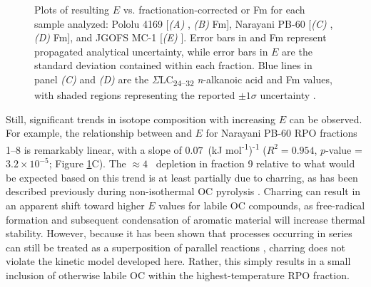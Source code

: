 \begin{figure}[p]
	\caption[RPO $E$ vs. isotope plots for all fractions in all samples]{Plots of resulting $E$ vs. fractionation-corrected  or Fm for each sample analyzed: Pololu 4169 [\textit{(A)} , \textit{(B)} Fm], Narayani PB-60 [\textit{(C)} , \textit{(D)} Fm], and JGOFS MC-1 [\textit{(E)} ]. Error bars in  and Fm represent propagated analytical uncertainty, while error bars in $E$ are the standard deviation contained within each fraction. Blue lines in panel \textit{(C)} and \textit{(D)} are the $\Sigma$LC\textsubscript{24--32} \textit{n}-alkanoic acid  and Fm values, with shaded regions representing the reported $\pm 1 \sigma$ uncertainty \citep{Galy:2011hk,Galy:2011ix}.}
	\label{Ch3Fig:9} 
\end{figure}

Still, significant trends in isotope composition with increasing $E$ can be observed. For example, the relationship between  and $E$ for Narayani PB-60 RPO fractions 1--8 is remarkably linear, with a slope of $0.07$\textperthousand\ (kJ mol\textsuperscript{-1})\textsuperscript{-1} ($R^{2} = 0.954$, $p$-value = $3.2 \times 10^{-5}$; Figure \ref{Ch3Fig:9}C). The $\approx 4$\textperthousand\  depletion in fraction 9 relative to what would be expected based on this trend is at least partially due to charring, as has been described previously during non-isothermal OC pyrolysis \citep{Williams:2014bq}. Charring can result in an apparent shift toward higher $E$ values for labile OC compounds, as free-radical formation and subsequent condensation of aromatic material will increase thermal stability. However, because it has been shown that processes occurring in series can still be treated as a superposition of parallel reactions \citep{Forney:2014ws}, charring does not violate the kinetic model developed here. Rather, this simply results in a small inclusion of otherwise labile OC within the highest-temperature RPO fraction.

